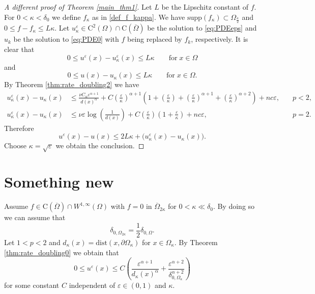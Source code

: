 \documentclass[12pt,reqno]{amsart}
\numberwithin{figure}{section}
\theoremstyle{plain}
\theoremstyle{remark}
\numberwithin{equation}{section}
\newcommand{\rmC}{\mathrm{C}}
\begin{document}
\begin{proof}[A different proof of Theorem \ref{main_thm1}] Let $L$ be the Lipschitz constant of $f$. For $0 < \kappa <\delta_0$ we define $f_\kappa$ as in \eqref{def_f_kappa}. We have $\mathrm{supp}(f_\kappa)\subset\Omega_{\frac{\kappa}{2}}$ and $0\leq f - f_\kappa \leq L\kappa$. Let $u^\varepsilon_\kappa\in \rmC^2(\Omega)\cap \rmC(\overline{\Omega})$ be the solution to \eqref{eq:PDEeps} and $u_k$ be the solution to \eqref{eq:PDE0} with $f$ being replaced by $f_k$, respectively. It is clear that
\begin{equation*}
  0\leq u^\varepsilon(x) - u^\varepsilon_\kappa(x)\leq L\kappa \qquad\text{for}\;x\in \Omega
\end{equation*}
and
\begin{equation*}
    0\leq u(x) - u_\kappa(x)\leq L\kappa \qquad\text{for}\;x\in \Omega.
\end{equation*}
By Theorem \ref{thm:rate_doubling2} we have 
\begin{equation*}
\begin{aligned}
    u_\kappa^\varepsilon(x) - u_\kappa(x) &\leq\frac{\nu C_\alpha \varepsilon^{\alpha+1}}{d(x)^\alpha} + C\left(\frac{\varepsilon}{\kappa}\right)^{\alpha+1} \left(1+ \left(\frac{\varepsilon}{\kappa}\right) +\left(\frac{\varepsilon}{\kappa}\right)^{\alpha+1} +\left(\frac{\varepsilon}{\kappa}\right)^{\alpha+2}\right) + nc\varepsilon,  &\quad p <2, \\
    u_\kappa^\varepsilon(x) - u_\kappa(x) & \leq \nu \varepsilon \log\left( \frac{1}{d(x)}\right)+C\left(\frac{\varepsilon}{\kappa}\right) \left(1+\frac{\varepsilon}{\kappa}\right)+ nc \varepsilon, &\quad p=2.
\end{aligned}
\end{equation*}
Therefore
\begin{equation*}
    u^\varepsilon(x)-u(x)\leq 2L\kappa + \Big(u^\varepsilon_\kappa(x) - u_\kappa(x)\Big).
\end{equation*} 
Choose $\kappa = \sqrt{\varepsilon}$ we obtain the conclusion.
\end{proof}

\section{Something new}
Assume $f\in \mathrm{C}(\overline{\Omega})\cap W^{1,\infty}(\Omega)$ with $f = 0$ in $\overline{\Omega}_{2\kappa}$ for $0<\kappa \ll \delta_0$. By doing so we can assume that
\begin{equation*}
    \delta_{0,\Omega_{2\kappa}} = \frac{1}{2}\delta_{0,\Omega}.
\end{equation*}
Let $1<p<2$ and $d_\kappa(x) = \mathrm{dist}(x,\partial\Omega_\kappa)$ for $x\in \Omega_\kappa$. By Theorem \ref{thm:rate_doubling0} we obtain that
\begin{equation*}
    0\leq u^\varepsilon(x)\leq C \left(\frac{\varepsilon^{\alpha+1}}{d_\kappa(x)^{\alpha}} + \frac{\varepsilon^{\alpha+2}}{\delta_{0,\Omega_{\kappa}}^{\alpha+2}}\right)
\end{equation*}
for some constant $C$ independent of $\varepsilon\in (0,1)$ and $\kappa$.
\end{document}
